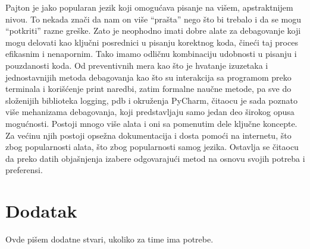 \documentclass[a4paper]{article}
\begin{document}
Pajton je jako popularan jezik koji omogućava pisanje na višem, apstraktnijem nivou. To nekada znači da nam on više “prašta” nego što bi trebalo i da se mogu “potkriti” razne greške. Zato je neophodno imati dobre alate za debagovanje koji mogu delovati kao ključni posrednici u pisanju korektnog koda, čineći taj proces efikasnim i nenapornim. Tako imamo odličnu kombinaciju udobnosti u pisanju i pouzdanosti koda. Od preventivnih mera kao što je hvatanje izuzetaka i jednostavnijih metoda debagovanja kao što su interakcija sa programom preko terminala i korišćenje print naredbi, zatim formalne naučne metode, pa sve do složenijih biblioteka logging, pdb i okruženja PyCharm, čitaocu je sada poznato više mehanizama debagovanja, koji predstavljaju samo jedan deo širokog opusa mogućnosti. Postoji mnogo više alata i oni sa pomenutim dele ključne koncepte. Za većinu njih postoji opsežna dokumentacija i dosta pomoći na internetu, što zbog popularnosti alata, što zbog popularnosti samog jezika. Ostavlja se čitaocu da preko datih objašnjenja izabere odgovarajući metod na osnovu svojih potreba i preferensi.


\appendix
 


\newpage

\appendix
\section{Dodatak}
Ovde pišem dodatne stvari, ukoliko za time ima potrebe.
\end{document}
